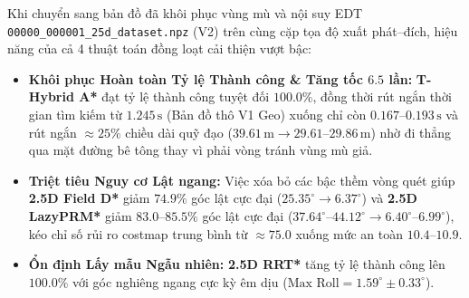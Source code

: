 \documentclass[a4paper,fleqn]{cas-sc}
\begin{document}
Khi chuyển sang bản đồ đã khôi phục vùng mù và nội suy EDT \texttt{00000\_000001\_25d\_dataset.npz} (V2) trên cùng cặp tọa độ xuất phát--đích, hiệu năng của cả 4 thuật toán đồng loạt cải thiện vượt bậc:
\begin{itemize}
    \item \textbf{Khôi phục Hoàn toàn Tỷ lệ Thành công \& Tăng tốc $6.5$ lần:} \textbf{T-Hybrid A*} đạt tỷ lệ thành công tuyệt đối \textbf{$100.0\%$}, đồng thời rút ngắn thời gian tìm kiếm từ $1.245\,\text{s}$ (Bản đồ thô V1 Geo) xuống chỉ còn \textbf{$0.167\text{--}0.193\,\text{s}$} và rút ngắn $\approx 25\%$ chiều dài quỹ đạo ($39.61\,\text{m} \to 29.61\text{--}29.86\,\text{m}$) nhờ đi thẳng qua mặt đường bê tông thay vì phải vòng tránh vùng mù giả.
    \item \textbf{Triệt tiêu Nguy cơ Lật ngang:} Việc xóa bỏ các bậc thềm vòng quét giúp \textbf{2.5D Field D*} giảm \textbf{$74.9\%$} góc lật cực đại ($25.35^\circ \to 6.37^\circ$) và \textbf{2.5D LazyPRM*} giảm \textbf{$83.0\text{--}85.5\%$} góc lật cực đại ($37.64^\circ\text{--}44.12^\circ \to 6.40^\circ\text{--}6.99^\circ$), kéo chỉ số rủi ro costmap trung bình từ $\approx 75.0$ xuống mức an toàn $10.4\text{--}10.9$.
    \item \textbf{Ổn định Lấy mẫu Ngẫu nhiên:} \textbf{2.5D RRT*} tăng tỷ lệ thành công lên $100.0\%$ với góc nghiêng ngang cực kỳ êm dịu ($\text{Max Roll} = 1.59^\circ \pm 0.33^\circ$).
\end{itemize}
\end{document}
